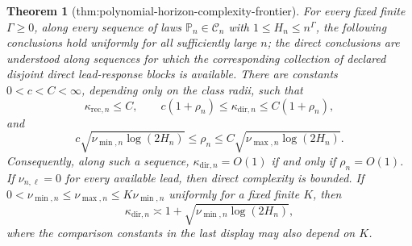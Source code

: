 \documentclass{article}
\newtheorem{theorem}{Theorem}
\begin{document}
\begin{theorem}[thm:polynomial-horizon-complexity-frontier]\label{thm:polynomial-horizon-complexity-frontier}
For every fixed finite \(\Gamma\ge 0\), along every sequence of laws \(\mathbb P_n\in\mathcal C_n\) with \(1\le H_n\le n^\Gamma\), the following conclusions hold uniformly for all sufficiently large \(n\); the direct conclusions are understood along sequences for which the corresponding collection of declared disjoint direct lead-response blocks is available. There are constants \(0<c<C<\infty\), depending only on the class radii, such that
\[
 \kappa_{\mathrm{rec},n}\le C,
 \qquad
 c(1+\rho_n)\le \kappa_{\mathrm{dir},n}\le C(1+\rho_n),
\]
and
\[
 c\sqrt{\nu_{\min,n}\log(2H_n)}
 \le \rho_n\le
 C\sqrt{\nu_{\max,n}\log(2H_n)}.
\]
Consequently, along such a sequence, \(\kappa_{\mathrm{dir},n}=O(1)\) if and only if \(\rho_n=O(1)\). If \(\nu_{n,\ell}=0\) for every available lead, then direct complexity is bounded. If \(0<\nu_{\min,n}\le\nu_{\max,n}\le K\nu_{\min,n}\) uniformly for a fixed finite \(K\), then
\[
 \kappa_{\mathrm{dir},n}\asymp
 1+\sqrt{\nu_{\min,n}\log(2H_n)},
\]
where the comparison constants in the last display may also depend on \(K\).
\end{theorem}
\end{document}
